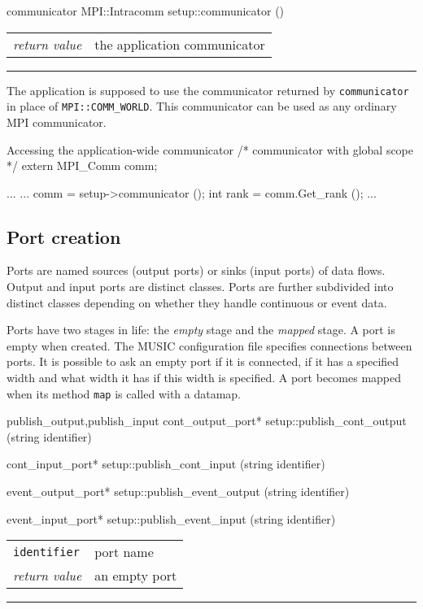 \documentclass[a4paper]{report}
\makeatletter
\newenvironment{parameters}%
{\begin{tabular}{@{\hspace{2em}}lp{0.6\textwidth}}}%
{\end{tabular}\par\vspace{1mm}\par\hrule\par\vspace{5mm}}
\makeatother
\begin{document}
\begin{head}{communicator}
  MPI::Intracomm setup::communicator ()
\end{head}
\begin{parameters}
  \emph{return value} & the application communicator \\
\end{parameters}

The application is supposed to use the communicator returned by
\lstinline|communicator| in place of \lstinline|MPI::COMM_WORLD|.  This
communicator can be used as any ordinary MPI communicator.

\begin{code}{Accessing the application-wide communicator}
/* communicator with global scope */
extern MPI_Comm comm;

...
{
  ...
  comm = setup->communicator ();
  int rank = comm.Get_rank ();
  ...
}
\end{code}

\subsection{Port creation}

Ports are named sources (output ports) or sinks (input ports) of data
flows.  Output and input ports are distinct classes.  Ports are
further subdivided into distinct classes depending on whether they
handle continuous or event data.

Ports have two stages in life: the \emph{empty} stage and the
\emph{mapped} stage.  A port is empty when created.  The MUSIC
configuration file specifies connections between ports.  It is
possible to ask an empty port if it is connected, if it has a
specified width and what width it has if this width is specified.  A port
becomes mapped when its method \lstinline|map| is called with a datamap.

\begin{head}{publish_output,publish_input}
  cont_output_port* setup::publish_cont_output (string identifier)

  cont_input_port* setup::publish_cont_input (string identifier)

  event_output_port* setup::publish_event_output (string identifier)

  event_input_port* setup::publish_event_input (string identifier)
\end{head}
\begin{parameters}
  \lstinline|identifier| & port name \\
  \emph{return value} & an empty port \\
\end{parameters}
\end{document}
